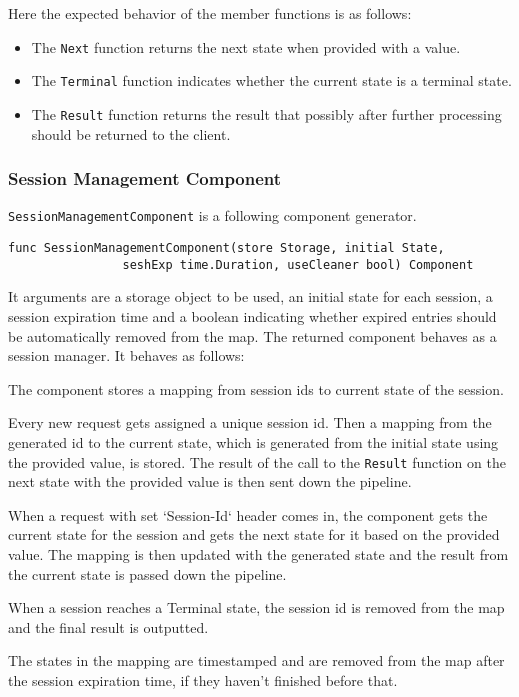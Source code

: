\documentclass[12pt,a4paper]{article}
\begin{document}
Here the expected behavior of the member functions is as follows:
\begin{itemize}
	\item The \texttt{Next} function returns the next state when provided with a value.
	\item The \texttt{Terminal} function indicates whether the current state is a terminal state.
	\item The \texttt{Result} function returns the result that possibly after further 
		  processing should be returned to the client.
\end{itemize}

\subsubsection{Session Management Component}
\texttt{SessionManagementComponent} is a following component generator.
\begin{lstlisting}
func SessionManagementComponent(store Storage, initial State, 
                seshExp time.Duration, useCleaner bool) Component
\end{lstlisting}

It arguments are a storage object to be used, an initial state for each session,
a session expiration time and a boolean indicating whether expired
entries should be automatically removed from the map.
The returned component behaves as a session manager. 
It behaves as follows:

The component stores a mapping from session ids to current state of the session.

Every new request gets assigned a unique session id. Then a mapping from the generated 
id to the current state, which is generated from the initial state using the provided value,
is stored. The result of the call to the \texttt{Result} function on the next state with the provided 
value is then sent down the pipeline.

When a request with set `Session-Id` header comes in, the component gets the current 
state for the session and gets the next state for it based on the provided value.
The mapping is then updated with the generated state and the result from the current state
is passed down the pipeline.

When a session reaches a Terminal state, the session id is removed from the map
and the final result is outputted.

The states in the mapping are timestamped and are removed from the map after
the session expiration time, if they haven't finished before that.
\end{document}
